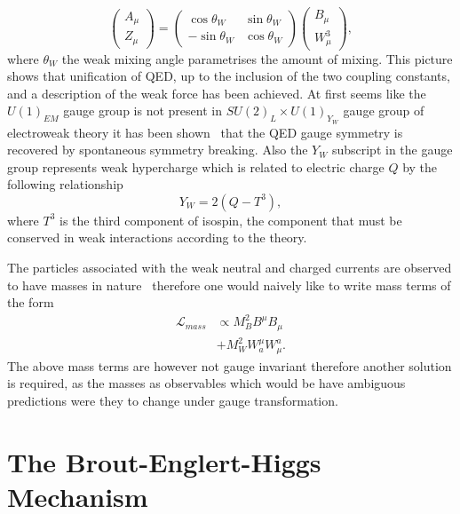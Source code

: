 \begin{equation}
  \label{eq:ew-mixing}
  \begin{pmatrix} A_\mu \\ Z_\mu
  \end{pmatrix} =
  \begin{pmatrix} \cos{\theta_W} & \sin{\theta_W} \\ -\sin{\theta_W} &
\cos{\theta_W}
  \end{pmatrix}
  \begin{pmatrix} B_\mu \\ W_\mu^3
  \end{pmatrix},
\end{equation} where $\theta_W$ the weak mixing angle parametrises the amount of
mixing. This picture shows that unification of QED, up to the inclusion of the
two coupling constants, and a description of the weak force has been achieved.
At first seems like the $U(1)_{EM}$ gauge group is not present in
$SU(2)_{L} \times U(1)_{Y_{W}}$ gauge group of electroweak theory it has been
shown~\cite{halzen} that the QED gauge symmetry is recovered by spontaneous
symmetry breaking. Also the $Y_W$ subscript in the gauge group represents weak
hypercharge which is related to electric charge $Q$ by the following
relationship
\begin{equation} Y_W = 2(Q - T^3),
\end{equation} where $T^3$ is the third component of isospin, the component that
must be conserved in weak interactions according to the theory.

The particles associated with the weak neutral and charged currents are observed
to have masses in nature~\cite{w-ua1, w-ua2, z-ua1, z-ua2} therefore one would
naively like to write mass terms of the form
\begin{align} \mathcal{L}_{mass} &\propto M^{2}_{B}B^{\mu}B_{\mu} \\ &+
M^{2}_{W}W^{\mu}_{a}W^{a}_{\mu}.
\end{align} The above mass terms are however not gauge invariant therefore
another solution is required, as the masses as observables which would be have
ambiguous predictions were they to change under gauge transformation.


\section{The Brout-Englert-Higgs Mechanism}%
\label{sec:higgs-mech}

